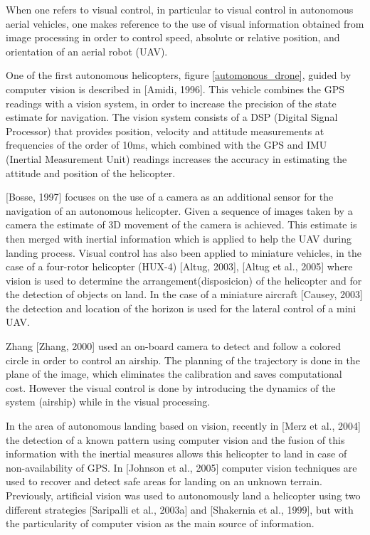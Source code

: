 When one refers to visual control, in particular to visual control in autonomous aerial vehicles, one makes reference to the use of visual information obtained from image processing in order to control speed, absolute or relative position, and orientation of an aerial robot (UAV).

One of the first autonomous helicopters, figure \ref{automonous_drone}, guided by computer vision is described in [Amidi, 1996]. This vehicle combines the GPS readings with a vision system, in order to increase the precision of the state estimate for navigation. The vision system consists of a DSP (Digital Signal Processor) that provides position, velocity and attitude measurements at frequencies of the order of 10ms, which combined with the GPS and IMU (Inertial Measurement Unit)  readings increases the accuracy in estimating the attitude and position of the helicopter. 

[Bosse, 1997] focuses on the use of a camera as an additional sensor for the navigation of an autonomous helicopter. Given a sequence of images taken by a camera the estimate of 3D movement of the camera is achieved. This estimate is then merged with inertial information which is applied to help the UAV during landing process. Visual control has also been applied to miniature vehicles, in the case of a four-rotor helicopter (HUX-4) [Altug, 2003], [Altug et al., 2005] where vision is used to determine the arrangement(disposicion) of the helicopter and for the detection of objects on land. In the case of a miniature aircraft [Causey, 2003] the detection and location of the horizon is used for the lateral control of a mini UAV.

Zhang [Zhang, 2000] used an on-board camera to detect and follow a colored circle in order to control an airship. The planning of the trajectory is done in the plane of the image, which eliminates the calibration and saves computational cost. However the visual control is done by introducing the dynamics of the system (airship) while in the visual processing.

In the area of autonomous landing based on vision, recently in [Merz et al., 2004] the detection of a known pattern using computer vision and the fusion of this information with the inertial measures allows this helicopter to land in case of non-availability of GPS. In [Johnson et al., 2005] computer vision techniques are used to recover and detect safe areas for landing on an unknown terrain. Previously, artificial vision was used to autonomously land a helicopter using two different strategies [Saripalli et al., 2003a] and [Shakernia et al., 1999], but with the particularity of computer vision as the main source of information.

